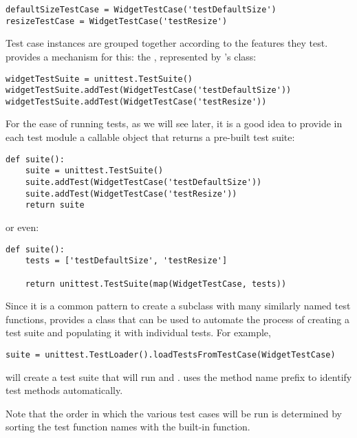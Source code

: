 \begin{verbatim}
defaultSizeTestCase = WidgetTestCase('testDefaultSize')
resizeTestCase = WidgetTestCase('testResize')
\end{verbatim}

Test case instances are grouped together according to the features
they test.   provides a mechanism for this: the
, represented by 's 
class:

\begin{verbatim}
widgetTestSuite = unittest.TestSuite()
widgetTestSuite.addTest(WidgetTestCase('testDefaultSize'))
widgetTestSuite.addTest(WidgetTestCase('testResize'))
\end{verbatim}

For the ease of running tests, as we will see later, it is a good
idea to provide in each test module a callable object that returns a
pre-built test suite:

\begin{verbatim}
def suite():
    suite = unittest.TestSuite()
    suite.addTest(WidgetTestCase('testDefaultSize'))
    suite.addTest(WidgetTestCase('testResize'))
    return suite
\end{verbatim}

or even:

\begin{verbatim}
def suite():
    tests = ['testDefaultSize', 'testResize']

    return unittest.TestSuite(map(WidgetTestCase, tests))
\end{verbatim}

Since it is a common pattern to create a  subclass
with many similarly named test functions,  provides a
 class that can be used to automate the process of
creating a test suite and populating it with individual tests.
For example,

\begin{verbatim}
suite = unittest.TestLoader().loadTestsFromTestCase(WidgetTestCase)
\end{verbatim}

will create a test suite that will run
 and .
 uses the  method name prefix to identify
test methods automatically.

Note that the order in which the various test cases will be run is
determined by sorting the test function names with the built-in
 function.

